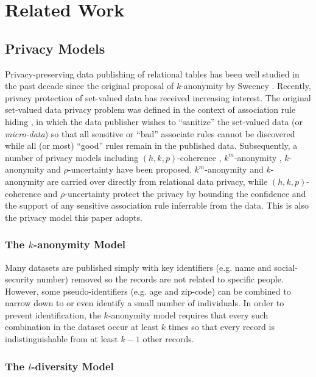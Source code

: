 \section{Related Work}
\label{sec:related}

\subsection{Privacy Models}

Privacy-preserving data publishing of relational tables has been well
studied in the past decade since the original proposal of $k$-anonymity by
Sweeney \etal \cite{Sweeney2002:k-anonymity}.
Recently, privacy protection of set-valued data has received increasing
interest. The original set-valued data privacy problem was defined in the
context of association rule hiding 
\cite{atallah99:disclosure,tkde:VerykiosEBSD04:ARH,tkde:WuCC07:hiding}, 
in which the data publisher
wishes to ``sanitize'' the set-valued data (or {\em micro-data}) so that all
sensitive or ``bad'' associate rules cannot be discovered while all (or most)
``good'' rules remain in the published data.
Subsequently, a number of privacy models
including $(h,k,p)$-coherence \cite{Xu:2008:ATD},
$k^m$-anonymity \cite{Terrovitis:2008:PAS},
$k$-anonymity \cite{He:2009:ASD} and
$\rho$-uncertainty \cite{Cao:2010:rho} have been proposed.
$k^m$-anonymity and $k$-anonymity are carried over directly from
relational data privacy,
while $(h,k,p)$-coherence and $\rho$-uncertainty protect the
privacy by bounding the confidence and the support of
any sensitive association rule inferrable from the data. This is
also the privacy model this paper adopts.

\subsubsection{The $k$-anonymity Model}

Many datasets are published simply with key identifiers (e.g. name and
social-security number) removed so the records are not related to specific
people.  However, some pseudo-identifiers (e.g. age and zip-code) can be
combined to narrow down to or even identify a small number of individuals.
In order to prevent identification, the $k$-anonymity model requires that
every such combination in the dataset occur at least $k$ times so that
every record is indistinguishable from at least $k-1$ other records.

\subsubsection{The $l$-diversity Model}

